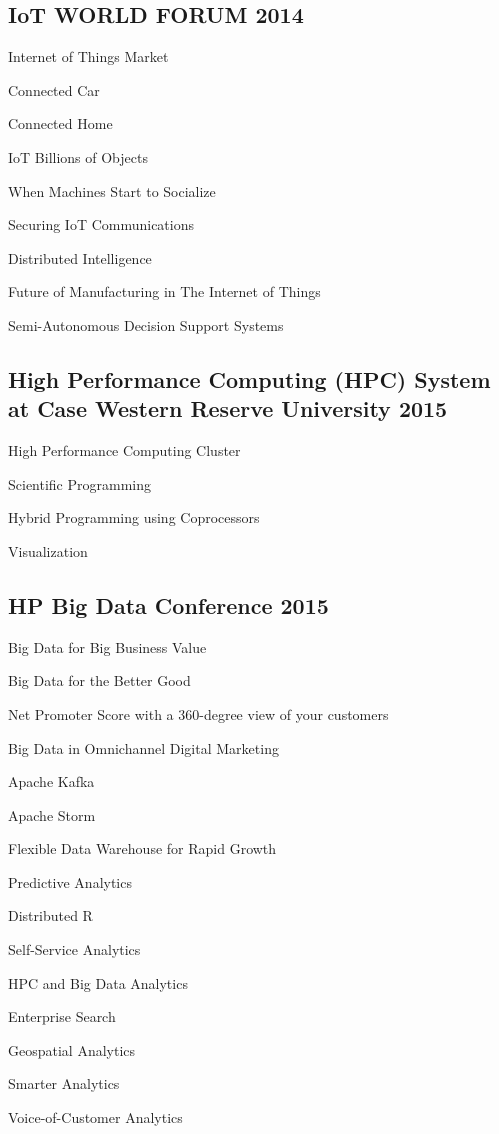 \documentclass{report}
\begin{document}
\subsection{IoT WORLD FORUM 2014}
Internet of Things Market

Connected Car

Connected Home

IoT Billions of Objects

When Machines Start to Socialize

Securing IoT Communications

Distributed Intelligence

Future of Manufacturing in The Internet of Things

Semi-Autonomous Decision Support Systems

\subsection{High Performance Computing (HPC) System at Case Western Reserve University 2015}

High Performance Computing Cluster

Scientific Programming

Hybrid Programming using Coprocessors

Visualization

\subsection{HP Big Data Conference 2015}

Big Data for Big Business Value

Big Data for the Better Good

Net Promoter Score with a 360-degree view of your customers

Big Data in Omnichannel Digital Marketing

Apache Kafka

Apache Storm

Flexible Data Warehouse for Rapid Growth

Predictive Analytics

Distributed R

Self-Service Analytics

HPC and Big Data Analytics

Enterprise Search

Geospatial Analytics

Smarter Analytics

Voice-of-Customer Analytics
\end{document}
